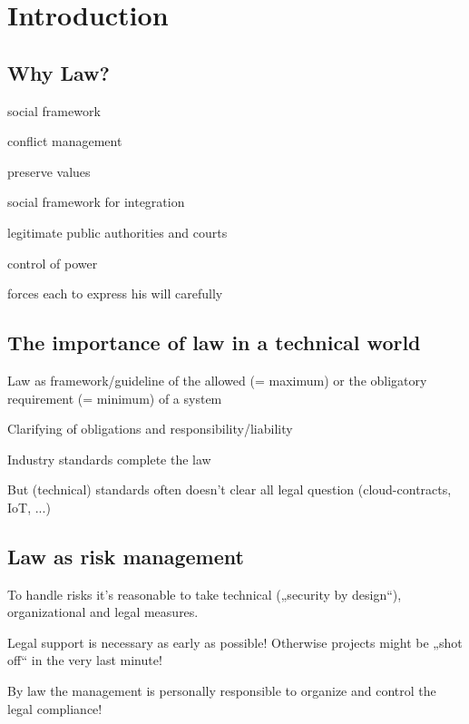 \section{Introduction}
\subsection{Why Law?}
\begin{compactitem}
	\item social framework 
	\item conflict management
	\item preserve values
	\item social framework for integration
	\item legitimate public authorities and courts
	\item control of power
	\item forces each to express his will carefully
\end{compactitem}

\subsection{The importance of law in a technical world}
\begin{compactitem}
	\item Law as framework/guideline of the allowed (= maximum) or the obligatory requirement (= minimum) of a system
	\item Clarifying of obligations and responsibility/liability
	\item Industry standards complete the law
	\item But (technical) standards often doesn't clear all legal question (cloud-contracts, IoT, ...)
\end{compactitem}

\subsection{Law as risk management}
\begin{compactitem}
	\item To handle risks it's reasonable to take technical („security by design“), organizational and legal measures.
	\item Legal support is necessary as early as possible! Otherwise projects might be „shot off“ in the very last minute!
	\item By law the management is personally responsible to organize and control the legal compliance! 
\end{compactitem}

